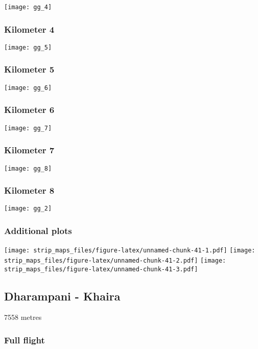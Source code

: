 \documentclass[]{article}
\begin{document}
\texttt{[image: gg\_4]}

\subsubsection{Kilometer 4}\label{kilometer-4-31}

\texttt{[image: gg\_5]}

\subsubsection{Kilometer 5}\label{kilometer-5-26}

\texttt{[image: gg\_6]}

\subsubsection{Kilometer 6}\label{kilometer-6-21}

\texttt{[image: gg\_7]}

\subsubsection{Kilometer 7}\label{kilometer-7-16}

\texttt{[image: gg\_8]}

\subsubsection{Kilometer 8}\label{kilometer-8-11}

\texttt{[image: gg\_2]}

\subsubsection{Additional plots}\label{additional-plots-32}

\texttt{[image: strip\_maps\_files/figure-latex/unnamed-chunk-41-1.pdf]}
\texttt{[image: strip\_maps\_files/figure-latex/unnamed-chunk-41-2.pdf]}
\texttt{[image: strip\_maps\_files/figure-latex/unnamed-chunk-41-3.pdf]}

\newpage

\subsection{Dharampani - Khaira}\label{dharampani---khaira}

7558 metres

\subsubsection{Full flight}\label{full-flight-33}
\end{document}
